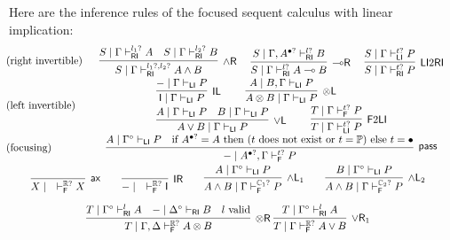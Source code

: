 \documentclass[submission,copyright,creativecommons]{eptcs}
\theoremstyle{definition}
\newcommand{\tl}{\otimes \mathsf{L}}
\newcommand{\tr}{\otimes \mathsf{R}}
\newcommand{\lright}{{\multimap}\mathsf{R}}
\newcommand{\pass}{\mathsf{pass}}
\newcommand{\unitl}{\mathsf{IL}}
\newcommand{\unitr}{\mathsf{IR}}
\newcommand{\andlone}{\land \mathsf{L}_{1}}
\newcommand{\andltwo}{\land \mathsf{L}_{2}}
\newcommand{\andr}{\land \mathsf{R}}
\newcommand{\orl}{\lor \mathsf{L}}
\newcommand{\orrone}{\lor \mathsf{R}_{1}}
\newcommand{\ax}{\mathsf{ax}}
\newcommand{\ot}{\otimes}
\newcommand{\lolli}{\multimap}
\newcommand{\I}{\mathsf{I}}
\newcommand{\RI}{\mathsf{RI}}
\newcommand{\LI}{\mathsf{LI}}
\newcommand{\F}{\mathsf{F}}
\newcommand{\tP}{\mathbb{P}}
\newcommand{\tCone}{\mathbb{C}_1}
\newcommand{\tCtwo}{\mathbb{C}_2}
\newcommand{\tE}{\mathbb{R}}
\newcommand{\proofbox}[1]{\begin{tabular}{l} #1 \end{tabular}}
\begin{document}
Here are the inference rules of the focused sequent calculus with linear implication:
\begin{equation}\label{eq:focus:impl}
  \!\!\!\!\!
  \begin{array}{lc}
    \text{(right invertible)} & %
    \proofbox{
      \infer[\andr]{S \mid \Gamma \vdash^{l_1?, l_2?}_{\RI} A \land B}{
        S \mid \Gamma \vdash^{l_1?}_{\RI} A
        &
        S \mid \Gamma \vdash^{l_2?}_{\RI} B
      }
    \quad
    \infer[\lright]{S \mid \Gamma \vdash^{l?}_{\RI} A \lolli B}{S \mid \Gamma , A^{\bullet ?} \vdash^{l?}_{\RI} B}
    \quad
    \infer[\LI 2 \RI]{S \mid \Gamma \vdash^{t?}_{\RI} P}{S \mid \Gamma \vdash^{t?}_{\LI} P}
    }
    \\[10pt]
    \text{(left invertible)} & %
    \proofbox{
      \infer[\unitl]{\I \mid \Gamma \vdash_{\LI} P}{{-} \mid \Gamma \vdash_{\LI} P}
    \qquad
    \infer[\tl]{A \ot B \mid \Gamma \vdash_{\LI} P}{A \mid B , \Gamma \vdash_{\LI} P}
    \\
    \infer[\orl]{A \lor B \mid \Gamma \vdash_\LI P}{
      A \mid \Gamma \vdash_\LI P
      &
      B \mid \Gamma \vdash_\LI P
    }
    \qquad
    \infer[\F 2 \LI]{T \mid \Gamma \vdash^{t?}_{\LI} P}{T \mid \Gamma \vdash^{t?}_{\F} P}
    }
    \\[10pt]
    \text{(focusing)} &    %
    \proofbox{
    \infer[\pass]{{-} \mid A^{\bullet ?} , \Gamma \vdash^{t?}_{\F} P }{
        A \mid \Gamma^{\circ} \vdash_{\LI} P
        &
        \text{if } A^{\bullet?} = A \text{ then } (t \text{ does not exist or } t = \tP) \text{ else } t = \bullet
    }
    }
    \\[10pt]
    \multicolumn{2}{c}{
    \infer[\ax]{X \mid \quad \vdash^{\tE?}_{\F} X}{}
    \qquad
    \infer[\unitr]{{-} \mid \quad \vdash^{\tE?}_{\F} \I}{}
    \qquad
    \infer[\andlone]{A \land B \mid \Gamma \vdash^{\tCone?}_{\F} P}{A \mid \Gamma^{\circ} \vdash_{\LI} P}
    \qquad
    \infer[\andltwo]{A \land B \mid \Gamma \vdash^{\tCtwo?}_{\F} P}{B \mid \Gamma^{\circ} \vdash_{\LI} P}
    }
    \\[10pt]
    \multicolumn{2}{c}{
    \infer[\tr]{T \mid \Gamma , \Delta \vdash^{\tE?}_{\F} A \ot B}{
      T \mid \Gamma^{\circ} \vdash^{l}_{\RI} A
      &
      {-} \mid \Delta^{\circ} \vdash_{\RI} B
      &
      l \ \text{valid}
    }
    \;
    \infer[\orrone]{T \mid \Gamma \vdash^{\tE?}_{\F} A \lor B}{
      T \mid \Gamma^{\circ} \vdash^{l}_{\RI} A
}}
\end{array}
\end{equation}
\end{document}
